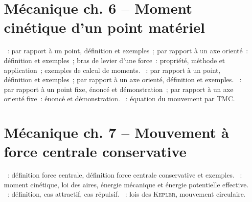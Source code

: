 \documentclass[a4paper, 12pt, final, garamond]{book}
\begin{document}
\section*{Mécanique ch. 6 -- Moment cinétique d'un point matériel}
\begin{enumerate}[label=\Roman*]
    ~: par rapport à un point, définition et exemples~;
        par rapport à un axe orienté~: définition et exemples~; bras de levier
        d'une force~: propriété, méthode et application~; exemples de calcul de
        moments.
    ~: par rapport à un point, définition et exemples~;
        par rapport à un axe orienté, définition et exemples.
    ~: par rapport à un point fixe, énoncé et
        démonstration~; par rapport à un axe orienté fixe~: énoncé et
        démonstration.
    ~: équation du mouvement par TMC.
\end{enumerate}

\section*{Mécanique ch. 7 -- Mouvement à force centrale conservative}
\begin{enumerate}[label=\Roman*]
    ~: définition force centrale,
        définition force centrale conservative et exemples.
    ~: moment cinétique, loi des aires, énergie
        mécanique et énergie potentielle effective.
    ~: définition, cas attractif, cas répulsif.
    ~: lois des \textsc{Kepler}, mouvement circulaire.
\end{enumerate}
\end{document}

